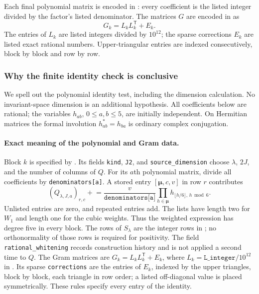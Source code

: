 \documentclass[11pt,a4paper]{article}
\begin{document}
Each final polynomial matrix is encoded in
: every coefficient is the listed integer
divided by the factor's listed denominator. The matrices $G$ are encoded in
 as
\[
 G_k=L_kL_k^{\mathsf T}+E_k.
\]
The entries of $L_k$ are listed integers divided by $10^{12}$; the sparse
corrections $E_k$ are listed exact rational numbers. Upper-triangular entries
are indexed consecutively, block by block and row by row.

\subsubsection{Why the finite identity check is conclusive}\label{sec:sos-identity}
We spell out the polynomial identity test, including the dimension
calculation. No invariant-space dimension is an additional hypothesis.
All coefficients below are rational; the variables $h_{ab}$,
$0\le a,b\le5$, are initially independent. On Hermitian matrices the
formal involution $h_{ab}^*=h_{ba}$ is ordinary complex conjugation.

\paragraph{Exact meaning of the polynomial and Gram data.}
Block $k$ is specified by .
Its fields \texttt{kind}, \texttt{J2}, and \texttt{source\_dimension}
choose $\lambda$, $2J$, and the number of columns of $Q$.
For its $a$th polynomial matrix, divide all coefficients by
\texttt{denominators[a]}. A stored entry $[\boldsymbol\mu,c,v]$
in row $r$ contributes
\[
 (Q_{\lambda,J,a})_{r,c}\mathrel{+}=
 \frac{v}{\texttt{denominators[a]}}
 \prod_{h\in\boldsymbol\mu}h_{\lfloor h/6\rfloor,\,h\bmod6}.
\]
Unlisted entries are zero, and repeated entries add. The lists have
length two for $W_1$ and length one for the cubic weights. Thus the
weighted expression has degree five in every block.
The rows of $S_\lambda$ are the integer rows in
; no orthonormality of those rows is required
for positivity. The field \texttt{rational\_whitening} records
construction history and is not applied a second time to $Q$.
The Gram matrices are
$G_k=L_kL_k^{\mathsf T}+E_k$, where
$L_k=\texttt{L\_integer}/10^{12}$ in
. Its sparse \texttt{corrections}
are the entries of $E_k$, indexed by the upper triangles, block by
block, each triangle in row order; a listed off-diagonal value is
placed symmetrically. These rules specify every entry of the identity.
\end{document}
